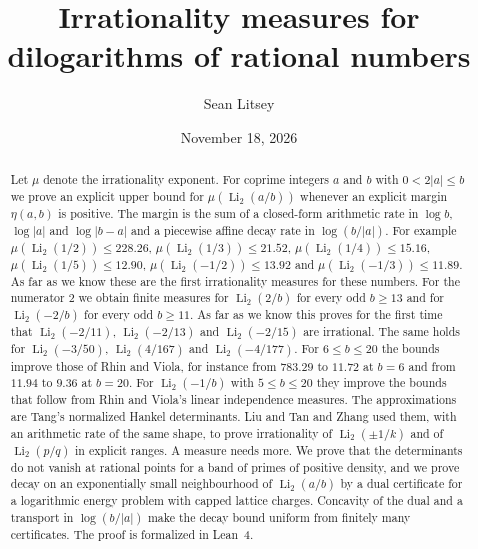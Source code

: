\documentclass[11pt]{amsart}
\theoremstyle{definition}
\theoremstyle{remark}
\numberwithin{equation}{section}
\newcommand{\Li}{\operatorname{Li}}
\begin{document}
\title[Irrationality measures for $\Li_2(a/b)$]{Irrationality measures for dilogarithms of rational numbers}

\author{Sean Litsey}

\date{November 18, 2026}



\begin{abstract}
Let $\mu$ denote the irrationality exponent. For coprime integers $a$ and $b$ with $0<2|a|\le b$ we prove an
explicit upper bound for $\mu(\Li_2(a/b))$ whenever an explicit margin $\eta(a,b)$ is positive. The margin is the sum of
a closed-form arithmetic rate in $\log b$, $\log|a|$ and $\log|b-a|$ and a piecewise affine decay rate in
$\log(b/|a|)$. For example $\mu(\Li_2(1/2))\le228.26$, $\mu(\Li_2(1/3))\le21.52$, $\mu(\Li_2(1/4))\le15.16$,
$\mu(\Li_2(1/5))\le12.90$, $\mu(\Li_2(-1/2))\le13.92$ and $\mu(\Li_2(-1/3))\le11.89$. As far as we know these
are the first irrationality measures for these numbers. For the numerator $2$ we obtain finite measures for
$\Li_2(2/b)$ for every odd $b\ge13$ and for $\Li_2(-2/b)$ for every odd $b\ge11$. As far as we know this proves for the
first time that $\Li_2(-2/11)$, $\Li_2(-2/13)$ and $\Li_2(-2/15)$ are irrational. The same holds for $\Li_2(-3/50)$,
$\Li_2(4/167)$ and $\Li_2(-4/177)$. For $6\le b\le20$ the bounds improve those of Rhin and Viola, for instance
from $783.29$ to $11.72$ at $b=6$ and from $11.94$ to $9.36$ at $b=20$. For $\Li_2(-1/b)$
with $5\le b\le20$ they improve the bounds that follow from Rhin and Viola's linear independence measures. The
approximations are Tang's normalized Hankel determinants. Liu and Tan and Zhang used them, with an arithmetic rate of
the same shape, to prove irrationality of $\Li_2(\pm1/k)$ and of $\Li_2(p/q)$ in explicit
ranges. A measure needs more. We prove that the determinants do not vanish at rational points for a band of primes
of positive density, and we prove decay on an exponentially small neighbourhood of $\Li_2(a/b)$ by a dual
certificate for a logarithmic energy problem with capped lattice charges. Concavity of the dual and a transport in
$\log(b/|a|)$ make the decay bound uniform from finitely many certificates. The proof is formalized in Lean~4.
\end{abstract}
\end{document}
